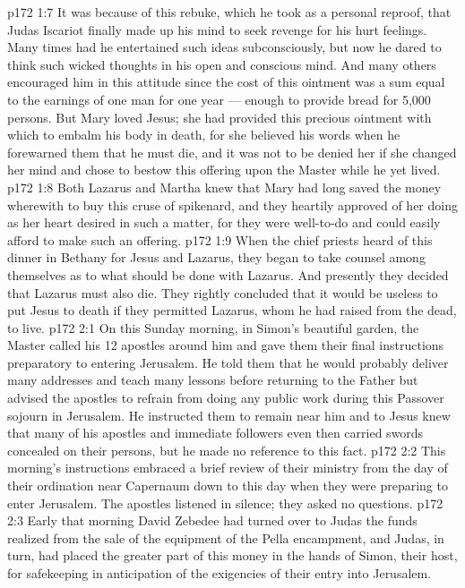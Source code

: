 \vs p172 1:7 It was because of this rebuke, which he took as a personal reproof, that Judas Iscariot finally made up his mind to seek revenge for his hurt feelings. Many times had he entertained such ideas subconsciously, but now he dared to think such wicked thoughts in his open and conscious mind. And many others encouraged him in this attitude since the cost of this ointment was a sum equal to the earnings of one man for one year --- enough to provide bread for 5,000 persons. But Mary loved Jesus; she had provided this precious ointment with which to embalm his body in death, for she believed his words when he forewarned them that he must die, and it was not to be denied her if she changed her mind and chose to bestow this offering upon the Master while he yet lived.
\vs p172 1:8 Both Lazarus and Martha knew that Mary had long saved the money wherewith to buy this cruse of spikenard, and they heartily approved of her doing as her heart desired in such a matter, for they were well\hyp{}to\hyp{}do and could easily afford to make such an offering.
\vs p172 1:9 When the chief priests heard of this dinner in Bethany for Jesus and Lazarus, they began to take counsel among themselves as to what should be done with Lazarus. And presently they decided that Lazarus must also die. They rightly concluded that it would be useless to put Jesus to death if they permitted Lazarus, whom he had raised from the dead, to live.
\vs p172 2:1 On this Sunday morning, in Simon’s beautiful garden, the Master called his 12 apostles around him and gave them their final instructions preparatory to entering Jerusalem. He told them that he would probably deliver many addresses and teach many lessons before returning to the Father but advised the apostles to refrain from doing any public work during this Passover sojourn in Jerusalem. He instructed them to remain near him and to  Jesus knew that many of his apostles and immediate followers even then carried swords concealed on their persons, but he made no reference to this fact.
\vs p172 2:2 This morning’s instructions embraced a brief review of their ministry from the day of their ordination near Capernaum down to this day when they were preparing to enter Jerusalem. The apostles listened in silence; they asked no questions.
\vs p172 2:3 Early that morning David Zebedee had turned over to Judas the funds realized from the sale of the equipment of the Pella encampment, and Judas, in turn, had placed the greater part of this money in the hands of Simon, their host, for safekeeping in anticipation of the exigencies of their entry into Jerusalem.
